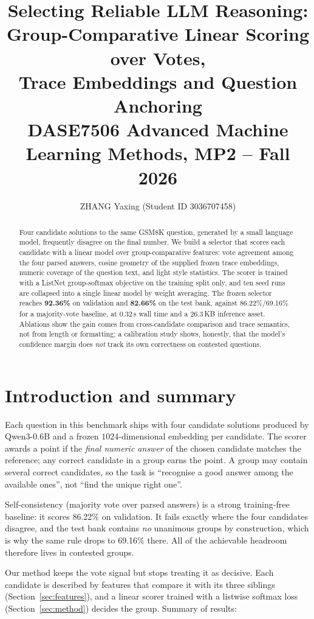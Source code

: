 \documentclass[10pt,a4paper]{article}
\title{\vspace{-1.2cm}\textbf{Selecting Reliable LLM Reasoning:\\
Group-Comparative Linear Scoring over Votes,\\
Trace Embeddings and Question Anchoring}\\[0.4em]
\large DASE7506 Advanced Machine Learning Methods, MP2 -- Fall 2026}
\author{ZHANG Yaxing \quad (Student ID 3036707458)}
\date{}
\begin{document}
\maketitle
\vspace{-1.4em}

\begin{abstract}
\noindent
Four candidate solutions to the same GSM8K question, generated by a small
language model, frequently disagree on the final number. We build a selector
that scores each candidate with a linear model over group-comparative
features: vote agreement among the four parsed answers, cosine geometry of the
supplied frozen trace embeddings, numeric coverage of the question text, and
light style statistics. The scorer is trained with a ListNet group-softmax
objective on the training split only, and ten seed runs are collapsed into a
single linear model by weight averaging. The frozen selector reaches
\textbf{92.36\%} on validation and \textbf{82.66\%} on the test bank, against
86.22\%/69.16\% for a majority-vote baseline, at 0.32\,s wall time and a
26.3\,KB inference asset. Ablations show the gain comes from cross-candidate
comparison and trace semantics, not from length or formatting; a calibration
study shows, honestly, that the model's confidence margin does \emph{not}
track its own correctness on contested questions.
\end{abstract}

\section{Introduction and summary}

Each question in this benchmark ships with four candidate solutions produced
by Qwen3-0.6B and a frozen $1024$-dimensional embedding per candidate.
The scorer awards a point if the \emph{final numeric answer} of the chosen
candidate matches the reference; any correct candidate in a group earns the
point. A group may contain several correct candidates, so the task is
``recognise a good answer among the available ones'', not ``find the unique
right one''.

Self-consistency (majority vote over parsed answers) is a strong training-free
baseline: it scores 86.22\% on validation. It fails exactly where the four
candidates disagree, and the test bank contains \emph{no} unanimous groups by
construction, which is why the same rule drops to 69.16\% there. All of the
achievable headroom therefore lives in contested groups.

Our method keeps the vote signal but stops treating it as decisive. Each
candidate is described by features that compare it with its three siblings
(Section~\ref{sec:features}), and a linear scorer trained with a listwise
softmax loss (Section~\ref{sec:method}) decides the group. Summary of results:
\end{document}
